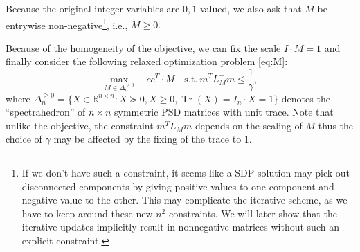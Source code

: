 \documentclass{article}
\DeclareMathOperator{\Tr}{Tr}
\begin{document}

Because the original integer variables are ${0,1}$-valued, we also ask that $M$ be entrywise non-negative\footnote{If we don't have such a constraint, it seems like a SDP solution may pick out disconnected components by giving positive values to one component and negative value to the other. This may complicate the iterative scheme, as we have to keep around these new $n^2$ constraints. We will later show that the iterative updates implicitly result in nonnegative matrices without such an explicit constraint.}, i.e., $M \geq 0.$


Because of the homogeneity of the objective, we can fix the scale $I \cdot M = 1$ and finally consider the following relaxed optimization problem \eqref{eq:M}:
\begin{equation}\label{eq:opt}
  \max_{M \in \Delta^{\geq 0}_n} \quad cc^T \cdot M \quad \mathrm{s.t.\ } m^T L_M^+ m \leq \frac{1}{\gamma},
\end{equation}
where $\Delta^{\geq 0}_n = \{X \in \mathbb{R}^{n \times n} : X \succeq 0, X \geq 0, \Tr(X) = I_n \cdot X = 1 \}$ denotes the ``spectrahedron'' of $n \times n$ symmetric PSD matrices with unit trace. Note that unlike the objective, the constraint $m^T L_M^+ m$ depends on the scaling of $M$ thus the choice of $\gamma$ may be affected by the fixing of the trace to 1.
\end{document}
